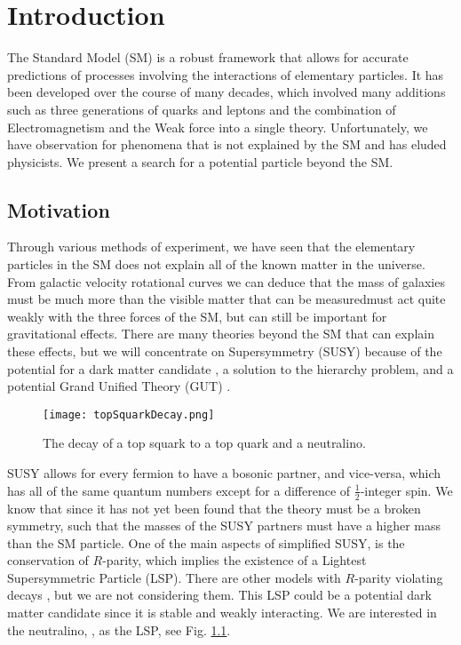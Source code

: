 \chapter{Introduction}
\label{ch:Intro}

The Standard Model (SM) \cite{gaillard_standard_1999} is a robust framework that allows for accurate predictions of processes involving the interactions of elementary particles. It has been developed over the course of many decades, which involved many additions such as three generations of quarks and leptons and the combination of Electromagnetism and the Weak force into a single theory. Unfortunately, we have observation for phenomena that is not explained by the SM and has eluded physicists. We present a search for a potential particle beyond the SM.
\section{Motivation}
\label{sec:Motivation}

Through various methods of experiment, we have seen that the elementary particles in the SM does not explain all of the known matter in the universe. From galactic velocity rotational curves we can deduce that the mass of galaxies must be much more than the visible matter that can be measuredmust act quite weakly with the three forces of the SM, but can still be important for gravitational effects. There are many theories beyond the SM that can explain these effects, but we will concentrate on Supersymmetry (SUSY) \cite{ramond_dual_1971, volkov_possible_1972, wess_supergauge_1974, fayet_supergauge_1975, barbieri_gauge_1982, chamseddine_locally_1982, hall_supergravity_1983, kane_study_1994, papucci_natural_2012} because of the potential for a dark matter candidate \cite{feng_dark_2010, bertone_dark_2005}, a solution to the hierarchy problem, and a potential Grand Unified Theory (GUT) \cite{georgi_unity_1974, georgi_hierarchy_1974, buras_aspects_1978}.

\begin{figure}
 	\centering
	\texttt{[image: topSquarkDecay.png]}
 	\caption[Top Squark Decay]{The decay of a top squark to a top quark and a neutralino.}
 	\label{topSquarkDecay} 
\end{figure}

SUSY allows for every fermion to have a bosonic partner, and vice-versa, which has all of the same quantum numbers except for a difference of $\frac{1}{2}$-integer spin. We know that since it has not yet been found that the theory must be a broken symmetry, such that the masses of the SUSY partners must have a higher mass than the SM particle. One of the main aspects of simplified SUSY, is the conservation of $R$-parity, which implies the existence of a Lightest Supersymmetric Particle (LSP). There are other models with $R$-parity violating decays \cite{barbier_r-parity-violating_2005, grossman_sneutrino_1999}, but we are not considering them. This LSP could be a potential dark matter candidate since it is stable and weakly interacting. We are interested in the neutralino, \neutralino, as the LSP, see Fig. \ref{topSquarkDecay}. 

